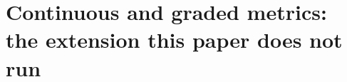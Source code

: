 %
%
%
%

\section{Continuous and graded metrics: the extension this paper does not run}
\label{app:continuous}

